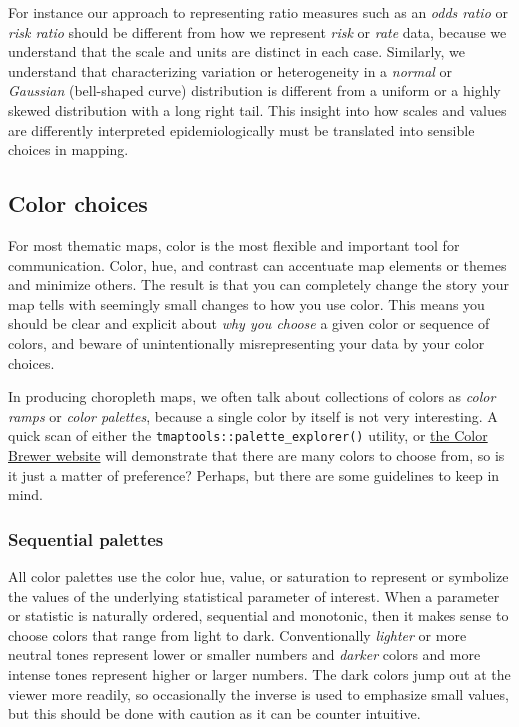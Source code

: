 \documentclass[
]{book}
\begin{document}
For instance our approach to representing ratio measures such as an \emph{odds ratio} or \emph{risk ratio} should be different from how we represent \emph{risk} or \emph{rate} data, because we understand that the scale and units are distinct in each case. Similarly, we understand that characterizing variation or heterogeneity in a \emph{normal} or \emph{Gaussian} (bell-shaped curve) distribution is different from a uniform or a highly skewed distribution with a long right tail. This insight into how scales and values are differently interpreted epidemiologically must be translated into sensible choices in mapping.

\hypertarget{color-choices}{%
\subsection{Color choices}\label{color-choices}}

For most thematic maps, color is the most flexible and important tool for communication. Color, hue, and contrast can accentuate map elements or themes and minimize others. The result is that you can completely change the story your map tells with seemingly small changes to how you use color. This means you should be clear and explicit about \emph{why you choose} a given color or sequence of colors, and beware of unintentionally misrepresenting your data by your color choices.

In producing choropleth maps, we often talk about collections of colors as \emph{color ramps} or \emph{color palettes}, because a single color by itself is not very interesting. A quick scan of either the \texttt{tmaptools::palette\_explorer()} utility, or \href{http://colorbrewer2.org/\#}{the Color Brewer website} will demonstrate that there are many colors to choose from, so is it just a matter of preference? Perhaps, but there are some guidelines to keep in mind.

\hypertarget{sequential-palettes}{%
\subsubsection{Sequential palettes}\label{sequential-palettes}}

All color palettes use the color hue, value, or saturation to represent or symbolize the values of the underlying statistical parameter of interest. When a parameter or statistic is naturally ordered, sequential and monotonic, then it makes sense to choose colors that range from light to dark. Conventionally \emph{lighter} or more neutral tones represent lower or smaller numbers and \emph{darker} colors and more intense tones represent higher or larger numbers. The dark colors jump out at the viewer more readily, so occasionally the inverse is used to emphasize small values, but this should be done with caution as it can be counter intuitive.
\end{document}
